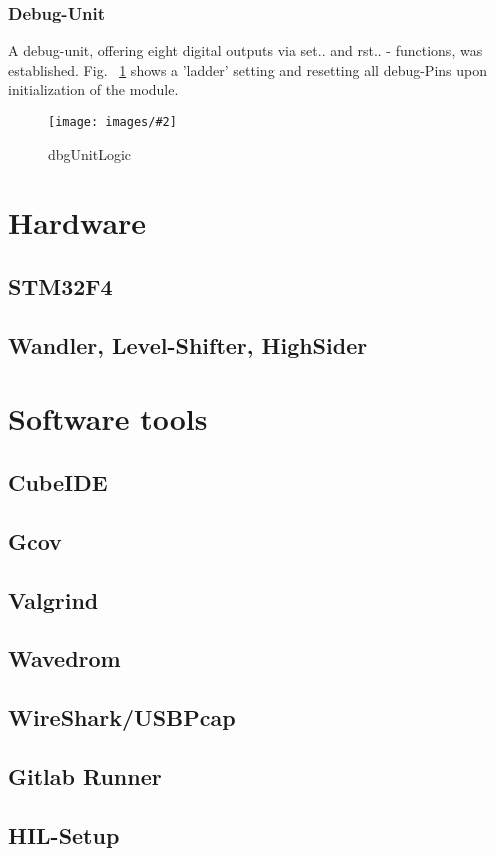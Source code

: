\documentclass[master,english,smartquotes,apa]{hgbthesis}
\newcommand \bildGr[5]{\begin{figure}[#1]	\centering	\texttt{[image: images/\#2]}	\caption{#3}	\label{#4}	\end{figure}}
\begin{document}
		\subsubsection{Debug-Unit}
		A debug-unit, offering eight digital outputs via set.. and rst.. - functions, was established. Fig. ~\ref{dbgUnitLogic} shows a 'ladder' setting and resetting all debug-Pins upon initialization of the module.
		
			\bildGr{b!}{dbgUnitLogic.png}{dbgUnitLogic}{dbgUnitLogic}{0.5\textwidth}

		
		
		\section{Hardware}
			\subsection{STM32F4}
			\subsection{Wandler, Level-Shifter, HighSider}

		\section{Software tools}
			\subsection{CubeIDE}
			\subsection{Gcov}
			\subsection{Valgrind}
			\subsection{Wavedrom}
			\subsection{WireShark/USBPcap}
			\subsection{Gitlab Runner}
			\subsection{HIL-Setup}
			
\end{document}
